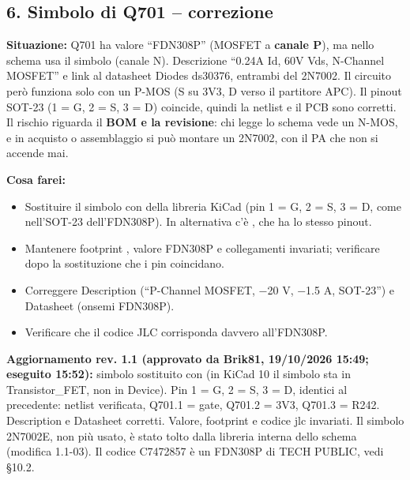 \subsection[6. Simbolo di Q701 – correzione]{6. Simbolo di Q701 – correzione }

\textbf{Situazione:} Q701 ha valore \textquotedblleft{}FDN308P\textquotedblright{} (MOSFET a \textbf{canale P}), ma nello schema usa il simbolo  (canale N). Descrizione \textquotedblleft{}0.24A Id, 60V Vds, N-Channel MOSFET\textquotedblright{} e link al datasheet Diodes ds30376, entrambi del 2N7002. Il circuito però funziona solo con un P-MOS (S su 3V3, D verso il partitore APC). Il pinout SOT-23 (1 = G, 2 = S, 3 = D) coincide, quindi la netlist e il PCB sono corretti. Il rischio riguarda il \textbf{BOM e la revisione}: chi legge lo schema vede un N-MOS, e in acquisto o assemblaggio si può montare un 2N7002, con il PA che non si accende mai.

\textbf{Cosa farei:}

\begin{itemize}
\item Sostituire il simbolo con  della libreria KiCad (pin 1 = G, 2 = S, 3 = D, come nell'SOT-23 dell'FDN308P). In alternativa c'è , che ha lo stesso pinout.
\item Mantenere footprint , valore FDN308P e collegamenti invariati; verificare dopo la sostituzione che i pin coincidano.
\item Correggere Description (\textquotedblleft{}P-Channel MOSFET, −20 V, −1.5 A, SOT-23\textquotedblright{}) e Datasheet (onsemi FDN308P).
\item Verificare che il codice JLC  corrisponda davvero all'FDN308P.
\end{itemize}

\begin{okbox}
\textbf{Aggiornamento rev. 1.1 (approvato da Brik81, 19/\allowbreak{}10/\allowbreak{}2026 15:49; eseguito 15:52):} simbolo sostituito con  (in KiCad 10 il simbolo sta in Transistor\_\allowbreak{}FET, non in Device). Pin 1 = G, 2 = S, 3 = D, identici al precedente: netlist verificata, Q701.1 = gate, Q701.2 = 3V3, Q701.3 = R242. Description e Datasheet corretti. Valore, footprint e codice jlc invariati. Il simbolo 2N7002E, non più usato, è stato tolto dalla libreria interna dello schema (modifica 1.1-03). Il codice C7472857 è un FDN308P di TECH PUBLIC, vedi §10.2.
\end{okbox}

